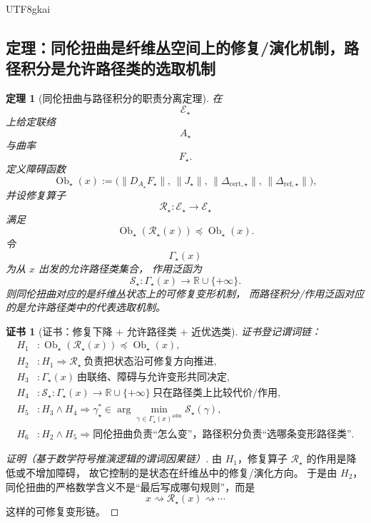 \documentclass[12pt]{article}
\newtheorem{theorem}{定理}[section]
\newtheorem{Certificate}{证书}[section]
\newcommand{\Ob}{\operatorname{Ob}}
\begin{document}
\begin{CJK*}{UTF8}{gkai}
\subsection{定理：同伦扭曲是纤维丛空间上的修复/演化机制，路径积分是允许路径类的选取机制}
\label{subsec:tex37-ch12-thm2}

\begin{theorem}[同伦扭曲与路径积分的职责分离定理]
\label{thm:tex37-ch12-homotopy}
在
\[
  \mathcal E_\star
\]
上给定联络
\[
  A_\star
\]
与曲率
\[
  F_\star.
\]
定义障碍函数
\[
  \Ob_\star(x)
  :=
  \bigl(
    \lVert D_{A_\star}F_\star\rVert,\,
    \lVert J_\star\rVert,\,
    \lVert \Delta_{\mathrm{cert},\star}\rVert,\,
    \lVert \Delta_{\mathrm{ref},\star}\rVert
  \bigr),
\]
并设修复算子
\[
  \mathcal R_\star:\mathcal E_\star\to \mathcal E_\star
\]
满足
\[
  \Ob_\star(\mathcal R_\star(x))\preceq \Ob_\star(x).
\]
令
\[
  \Gamma_\star(x)
\]
为从 $x$ 出发的允许路径类集合，
作用泛函为
\[
  \mathcal S_\star:\Gamma_\star(x)\to \mathbb{R}\cup\{+\infty\}.
\]
则同伦扭曲对应的是纤维丛状态上的可修复变形机制，
而路径积分/作用泛函对应的是允许路径类中的代表选取机制。
\end{theorem}

\begin{Certificate}[证书：修复下降 + 允许路径类 + 近优选类]
\label{cert:tex37-ch12-homotopy}
证书登记谓词链：
\[
\begin{aligned}
  H_1 &: \Ob_\star(\mathcal R_\star(x))\preceq \Ob_\star(x),\\
  H_2 &: H_1\Rightarrow \mathcal R_\star\ \text{负责把状态沿可修复方向推进},\\
  H_3 &: \Gamma_\star(x)\ \text{由联络、障碍与允许变形共同决定},\\
  H_4 &: \mathcal S_\star:\Gamma_\star(x)\to \mathbb{R}\cup\{+\infty\}\ \text{只在路径类上比较代价/作用},\\
  H_5 &: H_3\wedge H_4\Rightarrow
  \gamma_\star^\ast\in
  \arg\min_{\gamma\in \Gamma_\star(x)^{\mathrm{adm}}}\mathcal S_\star(\gamma),\\
  H_6 &: H_2\wedge H_5\Rightarrow
  \text{同伦扭曲负责“怎么变”，路径积分负责“选哪条变形路径类”}.
\end{aligned}
\]
\end{Certificate}

\begin{proof}[证明（基于数学符号推演逻辑的谓词因果链）]
由 $H_1$，修复算子 $\mathcal R_\star$ 的作用是降低或不增加障碍，
故它控制的是状态在纤维丛中的修复/演化方向。
于是由 $H_2$，同伦扭曲的严格数学含义不是“最后写成哪句规则”，而是
\[
  x
  \rightsquigarrow
  \mathcal R_\star(x)
  \rightsquigarrow
  \cdots
\]
这样的可修复变形链。


\end{proof}
\end{CJK*}
\end{document}
